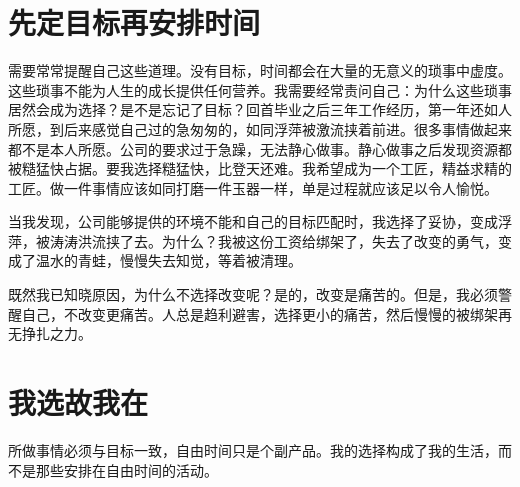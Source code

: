 \documentclass[10pt,a4paper,UTF8]{article}
\begin{document}
\section{先定目标再安排时间}
\label{sec:orga483a8e}


需要常常提醒自己这些道理。没有目标，时间都会在大量的无意义的琐事中虚度。这些琐事不能为人生的成长提供任何营养。我需要经常责问自己：为什么这些琐事居然会成为选择？是不是忘记了目标？回首毕业之后三年工作经历，第一年还如人所愿，到后来感觉自己过的急匆匆的，如同浮萍被激流挟着前进。很多事情做起来都不是本人所愿。公司的要求过于急躁，无法静心做事。静心做事之后发现资源都被糙猛快占据。要我选择糙猛快，比登天还难。我希望成为一个工匠，精益求精的工匠。做一件事情应该如同打磨一件玉器一样，单是过程就应该足以令人愉悦。

当我发现，公司能够提供的环境不能和自己的目标匹配时，我选择了妥协，变成浮萍，被涛涛洪流挟了去。为什么？我被这份工资给绑架了，失去了改变的勇气，变成了温水的青蛙，慢慢失去知觉，等着被清理。

既然我已知晓原因，为什么不选择改变呢？是的，改变是痛苦的。但是，我必须警醒自己，不改变更痛苦。人总是趋利避害，选择更小的痛苦，然后慢慢的被绑架再无挣扎之力。

\section{我选故我在}
\label{sec:org5bafae9}


所做事情必须与目标一致，自由时间只是个副产品。我的选择构成了我的生活，而不是那些安排在自由时间的活动。
\end{document}
